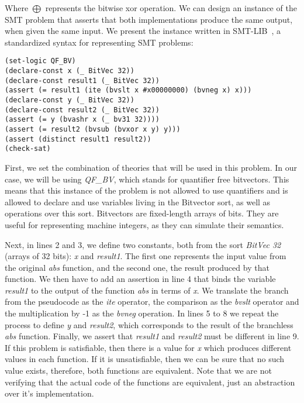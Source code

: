 Where $\bigoplus$ represents the bitwise xor operation. We can design an instance of the SMT problem that asserts that both implementations produce the same output, when given the same input. We present the instance written in SMT-LIB~\cite{smtlib}, a standardized syntax for representing SMT problems:

\begin{verbatim}
(set-logic QF_BV)
(declare-const x (_ BitVec 32))
(declare-const result1 (_ BitVec 32))
(assert (= result1 (ite (bvslt x #x00000000) (bvneg x) x)))
(declare-const y (_ BitVec 32))
(declare-const result2 (_ BitVec 32))
(assert (= y (bvashr x (_ bv31 32))))
(assert (= result2 (bvsub (bvxor x y) y)))
(assert (distinct result1 result2))
(check-sat)
\end{verbatim}

First, we set the combination of theories that will be used in this problem. In our case, we will be using \textit{QF\_BV}, which stands for quantifier free bitvectors. This means that this instance of the problem is not allowed to use quantifiers and is allowed to declare and use variables living in the Bitvector sort, as well as operations over this sort. Bitvectors are fixed-length arrays of bits. They are useful for representing machine integers, as they can simulate their semantics.

Next, in lines 2 and 3, we define two constants, both from the sort \textit{BitVec 32} (arrays of 32 bits): \textit{x} and \textit{result1}. The first one represents the input value from the original \textit{abs} function, and the second one, the result produced by that function. We then have to add an assertion in line 4 that binds the variable \textit{result1} to the output of the function \textit{abs} in terms of \textit{x}. We translate the branch from the pseudocode as the \textit{ite} operator, the comparison as the \textit{bvslt} operator and the multiplication by -1 as the \textit{bvneg} operation. In lines 5 to 8 we repeat the process to define \textit{y} and \textit{result2}, which corresponds to the result of the branchless \textit{abs} function. Finally, we assert that \textit{result1} and \textit{result2} must be different in line 9. If this problem is satisfiable, then there is a value for \textit{x} which produces different values in each function. If it is unsatisfiable, then we can be sure that no such value exists, therefore, both functions are equivalent. Note that we are not verifying that the actual code of the functions are equivalent, just an abstraction over it's implementation.

